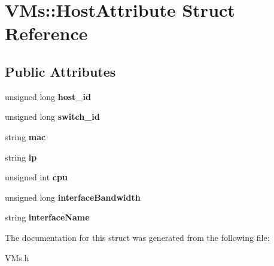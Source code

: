 \hypertarget{structVMs_1_1HostAttribute}{\section{\-V\-Ms\-:\-:\-Host\-Attribute \-Struct \-Reference}
\label{structVMs_1_1HostAttribute}
}
\subsection*{\-Public \-Attributes}
\begin{DoxyCompactItemize}
\item 
\hypertarget{structVMs_1_1HostAttribute_ace27e6d350613be81f43ce893257b37b}{unsigned long {\bfseries host\-\_\-id}}\label{structVMs_1_1HostAttribute_ace27e6d350613be81f43ce893257b37b}

\item 
\hypertarget{structVMs_1_1HostAttribute_a90987d49a77963c8bf632b9011a4fc79}{unsigned long {\bfseries switch\-\_\-id}}\label{structVMs_1_1HostAttribute_a90987d49a77963c8bf632b9011a4fc79}

\item 
\hypertarget{structVMs_1_1HostAttribute_abf0cee5b185669643fb0f7ac2d3464d3}{string {\bfseries mac}}\label{structVMs_1_1HostAttribute_abf0cee5b185669643fb0f7ac2d3464d3}

\item 
\hypertarget{structVMs_1_1HostAttribute_a930a49f7914acc59eab1fdef35c7ad1b}{string {\bfseries ip}}\label{structVMs_1_1HostAttribute_a930a49f7914acc59eab1fdef35c7ad1b}

\item 
\hypertarget{structVMs_1_1HostAttribute_ab8992f231be8a264a7a933139846639b}{unsigned int {\bfseries cpu}}\label{structVMs_1_1HostAttribute_ab8992f231be8a264a7a933139846639b}

\item 
\hypertarget{structVMs_1_1HostAttribute_a7fd2e57ae3610b8fffd012a5111429f9}{unsigned long {\bfseries interface\-Bandwidth}}\label{structVMs_1_1HostAttribute_a7fd2e57ae3610b8fffd012a5111429f9}

\item 
\hypertarget{structVMs_1_1HostAttribute_a1580c27ca233e3ee38c7aa9f5a49c7f3}{string {\bfseries interface\-Name}}\label{structVMs_1_1HostAttribute_a1580c27ca233e3ee38c7aa9f5a49c7f3}

\end{DoxyCompactItemize}


\-The documentation for this struct was generated from the following file\-:\begin{DoxyCompactItemize}
\item 
\-V\-Ms.\-h\end{DoxyCompactItemize}
